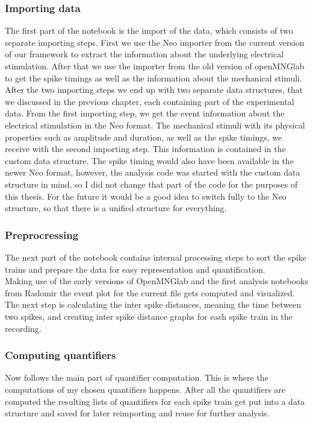 \subsubsection{Importing data}
The first part of the notebook is the import of the data, which consists of two separate importing steps. 
First we use the Neo importer from the current version of our framework to extract the information about the underlying electrical stimulation. After that we use the importer from the old version of openMNGlab to get the spike timings as well as the information about the mechanical stimuli.
After the two importing steps we end up with two separate data structures, that we discussed in the previous chapter, each containing part of the experimental data. From the first importing step, we get the event information about the electrical stimulation in the Neo format. The mechanical stimuli with its physical properties such as amplitude and duration, as well as the spike timings, we receive with the second importing step. This information is contained in the custom data structure. The spike timing would also have been available in the newer Neo format, however, the analysis code was started with the custom data structure in mind, so I did not change that part of the code for the purposes of this thesis. For the future it would be a good idea to switch fully to the Neo structure, so that there is a unified structure for everything.\\
\subsubsection{Preprocressing}
The next part of the notebook contains internal processing steps to sort the spike trains and prepare the data for easy representation and quantification.\\
Making use of the early versions of OpenMNGlab and the first analysis notebooks from Radomir the event plot for the current file gets computed and visualized. The next step is calculating the inter spike distances, meaning the time between two spikes, and creating inter spike distance graphs for each spike train in the recording.\\
\subsubsection{Computing quantifiers}
Now follows the main part of quantifier computation. This is where the computations of my chosen quantifiers happens. After all the quantifiers are computed the resulting lists of quantifiers for each spike train get put into a data structure and saved for later reimporting and reuse for further analysis.\\
